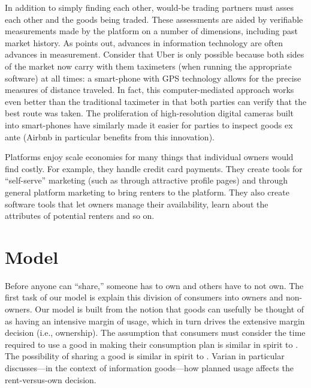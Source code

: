 \documentclass[11pt]{article}
\begin{document}
In addition to simply finding each other, would-be trading partners must asses each other and the goods being traded. 
These assessments are aided by verifiable measurements made by the platform on a number of dimensions, including past market history. 
As \cite{varian2010computer} points out, advances in information technology are often advances in measurement.  
Consider that Uber is only possible because both sides of the market now carry with them taximeters (when running the appropriate software) at all times: 
a smart-phone with GPS technology allows for the precise measures of distance traveled.
In fact, this computer-mediated approach works even better than the traditional taximeter in that both parties can verify that the best route was taken. 
The proliferation of high-resolution digital cameras built into smart-phones have similarly made it easier for parties to inspect goods ex ante (Airbnb in particular benefits from this innovation).  
 
Platforms enjoy scale economies for many things that individual owners would find costly. 
For example, they handle credit card payments. 
They create tools for ``self-serve'' marketing (such as through attractive profile pages) and through general platform marketing to bring renters to the platform. 
They also create software tools that let owners manage their availability, learn about the attributes of potential renters and so on. 


\section{Model} \label{sec:model}

Before anyone can ``share,'' someone has to own and others have to not own.
The first task of our model is explain this division of consumers into owners and non-owners. 
Our model is built from the notion that goods can usefully be thought of as having an intensive margin of usage, which in turn drives the extensive margin decision (i.e., ownership). 
The assumption that consumers must consider the time required to use a good in making their consumption plan is similar in spirit to \cite{becker1965theory}.
The possibility of sharing a good is similar in spirit to \cite{varian2000}.
Varian in particular discusses---in the context of information goods---how planned usage affects the rent-versus-own decision. 
\end{document}
